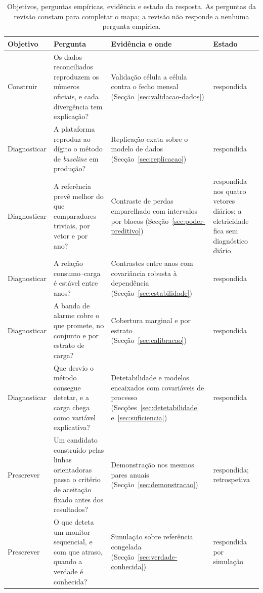 \begin{table}[htbp]
  \centering\small
  \caption{Objetivos, perguntas empíricas, evidência e estado da resposta.
  As perguntas da revisão constam para completar o mapa; a revisão não
  responde a nenhuma pergunta empírica.}
  \label{tab:objetivos-perguntas}
  \begin{tabularx}{\linewidth}{@{}>{\raggedright\arraybackslash}p{1.7cm}>{\raggedright\arraybackslash}X>{\raggedright\arraybackslash}X>{\raggedright\arraybackslash}p{3.1cm}@{}}
    \toprule
    Objetivo & Pergunta & Evidência e onde & Estado \\
    \midrule
    Construir & Os dados reconciliados reproduzem os números oficiais, e cada divergência tem explicação? & Validação célula a célula contra o fecho mensal (Secção~\ref{sec:validacao-dados}) & respondida \\
    \addlinespace
    Diagnosticar & A plataforma reproduz ao dígito o método de \emph{baseline} em produção? & Replicação exata sobre o modelo de dados (Secção~\ref{sec:replicacao}) & respondida \\
    Diagnosticar & A referência prevê melhor do que comparadores triviais, por vetor e por ano? & Contraste de perdas emparelhado com intervalos por blocos (Secção~\ref{sec:poder-preditivo}) & respondida nos quatro vetores diários; a eletricidade fica sem diagnóstico diário \\
    Diagnosticar & A relação consumo--carga é estável entre anos? & Contrastes entre anos com covariância robusta à dependência (Secção~\ref{sec:estabilidade}) & respondida \\
    Diagnosticar & A banda de alarme cobre o que promete, no conjunto e por estrato de carga? & Cobertura marginal e por estrato (Secção~\ref{sec:calibracao}) & respondida \\
    Diagnosticar & Que desvio o método consegue detetar, e a carga chega como variável explicativa? & Detetabilidade e modelos encaixados com covariáveis de processo (Secções~\ref{sec:detetabilidade} e~\ref{sec:suficiencia}) & respondida \\
    \addlinespace
    Prescrever & Um candidato construído pelas linhas orientadoras passa o critério de aceitação fixado antes dos resultados? & Demonstração nos mesmos pares anuais (Secção~\ref{sec:demonstracao}) & respondida; retrospetiva \\
    Prescrever & O que deteta um monitor sequencial, e com que atraso, quando a verdade é conhecida? & Simulação sobre referência congelada (Secção~\ref{sec:verdade-conhecida}) & respondida por simulação \\

\end{tabularx}
\end{table}

